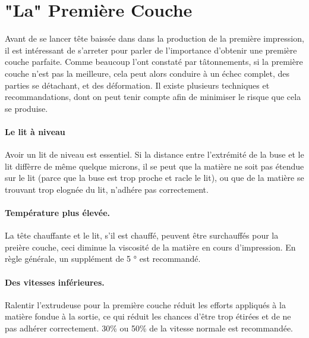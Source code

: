 
\section{"La" Première Couche}
\label{sec:the_important_first_layer}

Avant de se lancer tête baissée dans dans la production de la première impression, il est intéressant de s'arreter pour parler de l'importance d'obtenir une première couche parfaite. Comme beaucoup l'ont constaté par tâtonnements, si la première couche n'est pas la meilleure, cela peut alors conduire à un échec complet, des parties se détachant, et des déformation. Il existe plusieurs techniques et recommandations, dont on peut tenir compte afin de minimiser le risque que cela se produise.

\paragraph{Le lit à niveau} %
\label{par:level_bed}
Avoir un lit de niveau est essentiel. Si la distance entre l'extrémité de la buse et le lit diffèrre de même quelque microns, il se peut que la matière ne soit pas étendue sur le lit (parce que la buse est trop proche et racle le lit), ou que de la matière se trouvant trop elognée du lit, n'adhére pas correctement.

\paragraph{Température plus élevée.} %
\label{par:higher_temperature}
La tête chauffante et le lit, s'il est chauffé, peuvent être surchauffés pour la preière couche, ceci diminue la viscosité de la matière en cours d'impression.  En règle générale, un supplément de 5 ° est recommandé.

\paragraph{Des vitesses inférieures.} %
\label{par:lower_speeds}
Ralentir l'extrudeuse pour la première couche réduit les efforts appliqués à la matière fondue à la sortie, ce qui réduit les chances d'être trop étirées et de ne pas adhérer correctement. 30\% ou 50\% de la vitesse normale est recommandée.

